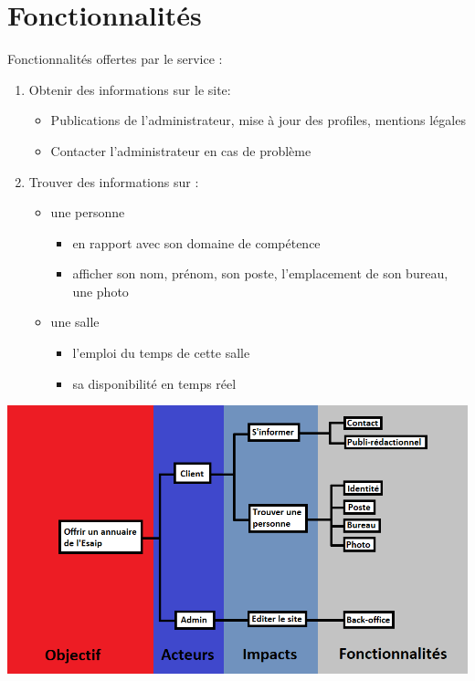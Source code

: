 \documentclass[11pt,a4paper]{report}
\begin{document}
		\section{Fonctionnalités}
			Fonctionnalités offertes par le service :
				\begin{enumerate}
					\item Obtenir des informations sur le site:
							\begin{itemize}
								 \item Publications de l'administrateur, mise à jour des profiles, mentions légales
								 \item Contacter l'administrateur en cas de problème
							\end{itemize}
					\item Trouver des informations sur :
				\begin{itemize}
					\item une personne 
										\begin{itemize}
											\item en rapport avec son domaine de compétence
											\item afficher son nom, prénom, son poste, l'emplacement de son bureau, une photo
										\end{itemize}
					\item une salle 
										\begin{itemize}
											\item l'emploi du temps de cette salle
											\item sa disponibilité en temps réel
										\end{itemize}
					\end{itemize}
				\end{enumerate}
				\begin{center}
					\includegraphics[scale=0.43]{OAIF}
				\end{center}
				
\end{document}
